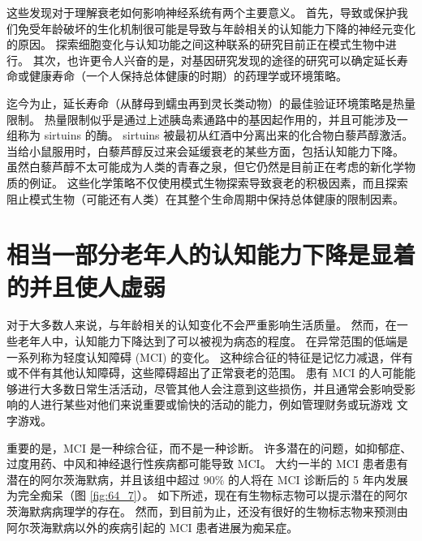 这些发现对于理解衰老如何影响神经系统有两个主要意义。
首先，导致或保护我们免受年龄破坏的生化机制很可能是导致与年龄相关的认知能力下降的神经元变化的原因。
探索细胞变化与认知功能之间这种联系的研究目前正在模式生物中进行。
其次，也许更令人兴奋的是，对基因研究发现的途径的研究可以确定延长寿命或健康寿命（一个人保持总体健康的时期）的药理学或环境策略。


迄今为止，延长寿命（从酵母到蠕虫再到灵长类动物）的最佳验证环境策略是热量限制。
热量限制似乎是通过上述胰岛素通路中的基因起作用的，并且可能涉及一组称为 sirtuins 的酶。
sirtuins 被最初从红酒中分离出来的化合物白藜芦醇激活。
当给小鼠服用时，白藜芦醇反过来会延缓衰老的某些方面，包括认知能力下降。
虽然白藜芦醇不太可能成为人类的青春之泉，但它仍然是目前正在考虑的新化学物质的例证。
这些化学策略不仅使用模式生物探索导致衰老的积极因素，而且探索阻止模式生物（可能还有人类）在其整个生命周期中保持总体健康的限制因素。



\section{相当一部分老年人的认知能力下降是显着的并且使人虚弱}

对于大多数人来说，与年龄相关的认知变化不会严重影响生活质量。
然而，在一些老年人中，认知能力下降达到了可以被视为病态的程度。
在异常范围的低端是一系列称为轻度认知障碍 (MCI) 的变化。
这种综合征的特征是记忆力减退，伴有或不伴有其他认知障碍，这些障碍超出了正常衰老的范围。
患有 MCI 的人可能能够进行大多数日常生活活动，尽管其他人会注意到这些损伤，并且通常会影响受影响的人进行某些对他们来说重要或愉快的活动的能力，例如管理财务或玩游戏 文字游戏。


重要的是，MCI 是一种综合征，而不是一种诊断。
许多潜在的问题，如抑郁症、过度用药、中风和神经退行性疾病都可能导致 MCI。
大约一半的 MCI 患者患有潜在的阿尔茨海默病，并且该组中超过 90\% 的人将在 MCI 诊断后的 5 年内发展为完全痴呆（图 \ref{fig:64_7}）。
如下所述，现在有生物标志物可以提示潜在的阿尔茨海默病病理学的存在。
然而，到目前为止，还没有很好的生物标志物来预测由阿尔茨海默病以外的疾病引起的 MCI 患者进展为痴呆症。


